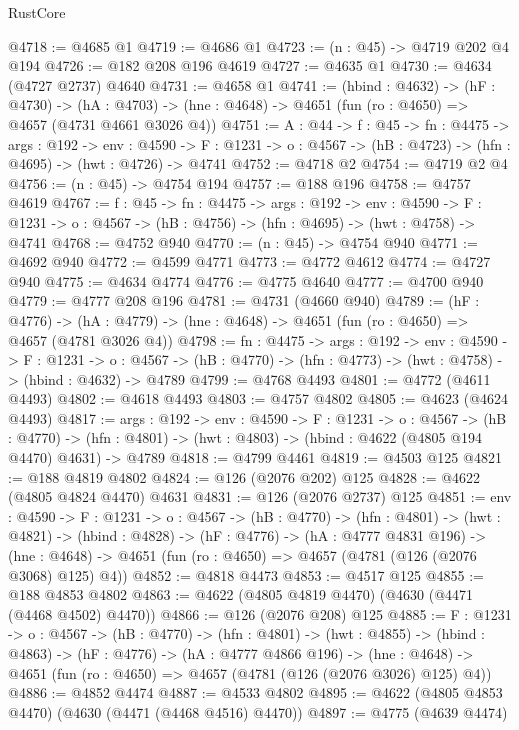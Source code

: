 \begin{lexlean}{RustCore}
\begin{coremodule}
@4718 := @4685 @1
@4719 := @4686 @1
@4723 := (n : @45) -> @4719 @202 @4 @194
@4726 := @182 @208 @196 @4619
@4727 := @4635 @1
@4730 := @4634 (@4727 @2737) @4640
@4731 := @4658 @1
@4741 := (hbind : @4632) ->
  (hF : @4730) ->
  (hA : @4703) -> (hne : @4648) -> @4651 (fun (ro : @4650) => @4657 (@4731 @4661 @3026 @4))
@4751 := {A : @44} ->
  {f : @45} ->
  {fn : @4475} ->
  {args : @192} ->
  {env : @4590} ->
  {F : @1231} -> {o : @4567} -> (hB : @4723) -> (hfn : @4695) -> (hwt : @4726) -> @4741
@4752 := @4718 @2
@4754 := @4719 @2 @4
@4756 := (n : @45) -> @4754 @194
@4757 := @188 @196
@4758 := @4757 @4619
@4767 := {f : @45} ->
  {fn : @4475} ->
  {args : @192} ->
  {env : @4590} ->
  {F : @1231} -> {o : @4567} -> (hB : @4756) -> (hfn : @4695) -> (hwt : @4758) -> @4741
@4768 := @4752 @940
@4770 := (n : @45) -> @4754 @940
@4771 := @4692 @940
@4772 := @4599 @4771
@4773 := @4772 @4612
@4774 := @4727 @940
@4775 := @4634 @4774
@4776 := @4775 @4640
@4777 := @4700 @940
@4779 := @4777 @208 @196
@4781 := @4731 (@4660 @940)
@4789 := (hF : @4776) ->
  (hA : @4779) -> (hne : @4648) -> @4651 (fun (ro : @4650) => @4657 (@4781 @3026 @4))
@4798 := {fn : @4475} ->
  {args : @192} ->
  {env : @4590} ->
  {F : @1231} ->
  {o : @4567} -> (hB : @4770) -> (hfn : @4773) -> (hwt : @4758) -> (hbind : @4632) -> @4789
@4799 := @4768 @4493
@4801 := @4772 (@4611 @4493)
@4802 := @4618 @4493
@4803 := @4757 @4802
@4805 := @4623 (@4624 @4493)
@4817 := {args : @192} ->
  {env : @4590} ->
  {F : @1231} ->
  {o : @4567} ->
  (hB : @4770) ->
  (hfn : @4801) -> (hwt : @4803) -> (hbind : @4622 (@4805 @194 @4470) @4631) -> @4789
@4818 := @4799 @4461
@4819 := @4503 @125
@4821 := @188 @4819 @4802
@4824 := @126 (@2076 @202) @125
@4828 := @4622 (@4805 @4824 @4470) @4631
@4831 := @126 (@2076 @2737) @125
@4851 := {env : @4590} ->
  {F : @1231} ->
  {o : @4567} ->
  (hB : @4770) ->
  (hfn : @4801) ->
  (hwt : @4821) ->
  (hbind : @4828) ->
  (hF : @4776) ->
  (hA : @4777 @4831 @196) ->
  (hne : @4648) -> @4651 (fun (ro : @4650) => @4657 (@4781 (@126 (@2076 @3068) @125) @4))
@4852 := @4818 @4473
@4853 := @4517 @125
@4855 := @188 @4853 @4802
@4863 := @4622 (@4805 @4819 @4470) (@4630 (@4471 (@4468 @4502) @4470))
@4866 := @126 (@2076 @208) @125
@4885 := {F : @1231} ->
  {o : @4567} ->
  (hB : @4770) ->
  (hfn : @4801) ->
  (hwt : @4855) ->
  (hbind : @4863) ->
  (hF : @4776) ->
  (hA : @4777 @4866 @196) ->
  (hne : @4648) -> @4651 (fun (ro : @4650) => @4657 (@4781 (@126 (@2076 @3026) @125) @4))
@4886 := @4852 @4474
@4887 := @4533 @4802
@4895 := @4622 (@4805 @4853 @4470) (@4630 (@4471 (@4468 @4516) @4470))
@4897 := @4775 (@4639 @4474)

\end{coremodule}
\end{lexlean}
